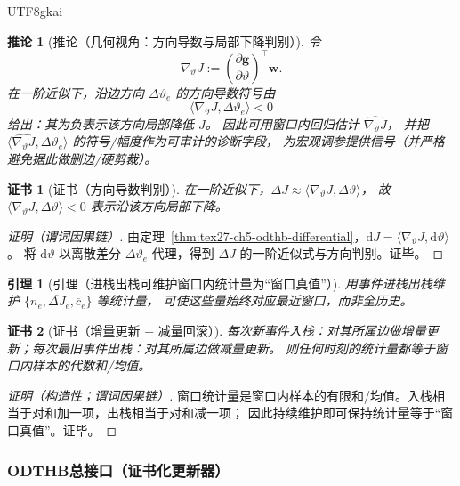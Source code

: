 \documentclass[12pt]{article}
\newtheorem{corollary}{推论}[section]
\newtheorem{lemma}{引理}[section]
\newtheorem{Certificate}{证书}[section]
\newcommand{\ORLDTHBase}{\textsf{ODTHB}}
\begin{document}
\begin{CJK*}{UTF8}{gkai}
\begin{corollary}[推论（几何视角：方向导数与局部下降判别）]
\label{cor:tex27-ch5-odthb-directional-derivative}
令
\[
  \nabla_{\vartheta}J:=\left(\frac{\partial\mathbf{g}}{\partial \vartheta}\right)^{\!\top}\mathbf{w}.
\]
在一阶近似下，沿边方向 $\Delta\vartheta_e$ 的方向导数符号由
\[
  \langle \nabla_{\vartheta}J,\Delta\vartheta_e\rangle<0
\]
给出：其为负表示该方向局部降低 $J$。
因此可用窗口内回归估计 $\widehat{\nabla_{\vartheta}J}$，
并把 $\langle \widehat{\nabla_{\vartheta}J},\Delta\vartheta_e\rangle$ 的符号/幅度作为可审计的诊断字段，
为宏观调参提供信号（并严格避免据此做删边/硬剪裁）。
\end{corollary}

\begin{Certificate}[证书（方向导数判别）]
\label{cert:tex27-ch5-odthb-directional-derivative}
在一阶近似下，$\Delta J\approx \langle \nabla_\vartheta J,\Delta\vartheta\rangle$，
故 $\langle \nabla_\vartheta J,\Delta\vartheta\rangle<0$ 表示沿该方向局部下降。
\end{Certificate}

\begin{proof}[证明（谓词因果链）]
由定理~\ref{thm:tex27-ch5-odthb-differential}，$\mathrm{d}J=\langle \nabla_\vartheta J,\mathrm{d}\vartheta\rangle$。
将 $\mathrm{d}\vartheta$ 以离散差分 $\Delta\vartheta_e$ 代理，得到 $\Delta J$ 的一阶近似式与方向判别。证毕。
\end{proof}

\begin{lemma}[引理（进栈出栈可维护窗口内统计量为“窗口真值”）]
\label{lem:tex27-ch5-odthb-push-pop}
用事件进栈出栈维护 $\{n_e,\overline{\Delta J}_e,\overline{c}_e\}$ 等统计量，
可使这些量始终对应最近窗口，而非全历史。
\end{lemma}

\begin{Certificate}[证书（增量更新 + 减量回滚）]
\label{cert:tex27-ch5-odthb-push-pop}
每次新事件入栈：对其所属边做增量更新；每次最旧事件出栈：对其所属边做减量更新。
则任何时刻的统计量都等于窗口内样本的代数和/均值。
\end{Certificate}

\begin{proof}[证明（构造性；谓词因果链）]
窗口统计量是窗口内样本的有限和/均值。入栈相当于对和加一项，出栈相当于对和减一项；
因此持续维护即可保持统计量等于“窗口真值”。证毕。
\end{proof}

\subsubsection{\ORLDTHBase 总接口（证书化更新器）}
\label{subsubsec:tex27-ch5-odthb-interface}


\end{CJK*}
\end{document}
